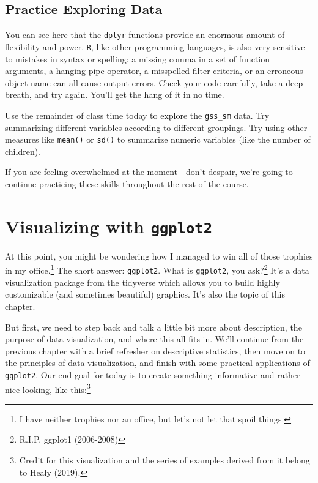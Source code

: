 \documentclass[
  letterpaper,
]{book}
\begin{document}
\hypertarget{practice-exploring-data}{%
\section{Practice Exploring Data}\label{practice-exploring-data}}

You can see here that the \texttt{dplyr} functions provide an enormous
amount of flexibility and power. \texttt{R}, like other programming
languages, is also very sensitive to mistakes in syntax or spelling: a
missing comma in a set of function arguments, a hanging pipe operator, a
misspelled filter criteria, or an erroneous object name can all cause
output errors. Check your code carefully, take a deep breath, and try
again. You'll get the hang of it in no time.

Use the remainder of class time today to explore the \texttt{gss\_sm}
data. Try summarizing different variables according to different
groupings. Try using other measures like \texttt{mean()} or
\texttt{sd()} to summarize numeric variables (like the number of
children).

If you are feeling overwhelmed at the moment - don't despair, we're
going to continue practicing these skills throughout the rest of the
course.


\hypertarget{visualizing-with-ggplot2}{%
\chapter{\texorpdfstring{Visualizing with
\texttt{ggplot2}}{Visualizing with ggplot2}}\label{visualizing-with-ggplot2}}

At this point, you might be wondering how I managed to win all of those
trophies in my office.\footnote{I have neither trophies nor an office,
  but let's not let that spoil things.} The short answer:
\texttt{ggplot2}. What is \texttt{ggplot2}, you ask?\footnote{R.I.P.
  ggplot1 (2006-2008)} It's a data visualization package from the
tidyverse which allows you to build highly customizable (and sometimes
beautiful) graphics. It's also the topic of this chapter.

But first, we need to step back and talk a little bit more about
description, the purpose of data visualization, and where this all fits
in. We'll continue from the previous chapter with a brief refresher on
descriptive statistics, then move on to the principles of data
visualization, and finish with some practical applications of
\texttt{ggplot2}. Our end goal for today is to create something
informative and rather nice-looking, like this:\footnote{Credit for this
  visualization and the series of examples derived from it belong to
  Healy (2019).}
\end{document}
